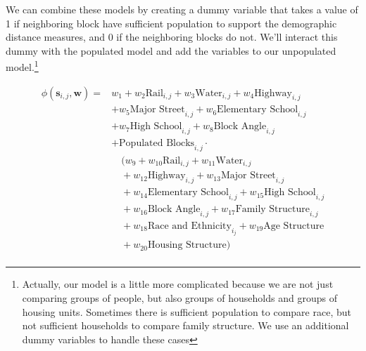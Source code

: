 \documentclass[12pt,letter]{article}\usepackage[]{graphicx}\usepackage[]{color}
\begin{document}
We can combine these models by creating a dummy variable that takes a
value of 1 if neighboring block have sufficient population to support
the demographic distance measures, and 0 if the neighboring blocks do
not. We'll interact this dummy with the populated model and add the
variables to our unpopulated model.\footnote{Actually, our model is
  a little more complicated because we are not just comparing
  groups of people, but also groups of households and groups of
  housing units. Sometimes there is sufficient population to compare
  race, but not sufficient households to compare family structure. We
  use an additional dummy variables to handle these cases}

\begin{align}
\phi(\mathbf{s}_{i,j}, \mathbf{w}) =  & w_1 
                                     + w_2\text{Rail}_{i,j} 
                                     + w_3\text{Water}_{i,j} 
                                     + w_4\text{Highway}_{i,j} \\
                                     &+ w_5\text{Major Street}_{i,j} 
                                     + w_6\text{Elementary School}_{i,j}\\ 
                                     & + w_7\text{High School}_{i,j}
                                     + w_8\text{Block Angle}_{i,j} \\
                                     &+ \text{Populated Blocks}_{i,j}\cdot\\
                                     &\quad (w_9
                                     + w_{10}\text{Rail}_{i,j} 
                                     + w_{11}\text{Water}_{i,j}\\ 
                                     &\quad+ w_{12}\text{Highway}_{i,j}
                                     + w_{13}\text{Major Street}_{i,j}\\ 
                                     &\quad + w_{14}\text{Elementary School}_{i,j} 
                                     + w_{15}\text{High School}_{i,j}\\ 
                                     &\quad + w_{16}\text{Block Angle}_{i,j}
                                     + w_{17}\text{Family Structure}_{i,j}\\
                                     &\quad + w_{18}\text{Race and Ethnicity}_{i_j}
                                     + w_{19}\text{Age Structure}\\  
                                     &\quad+ w_{20}\text{Housing Structure})\\
\end{align}
\end{document}
